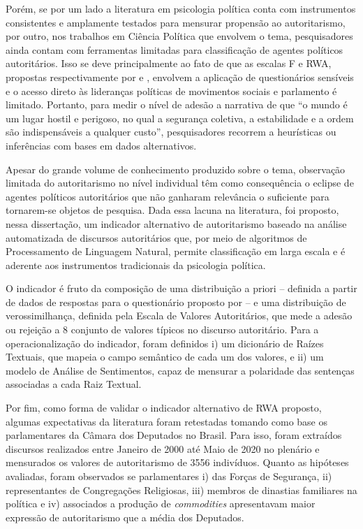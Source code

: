 \documentclass[
12pt,				%
openright,			%
twoside,			%
a4paper,			%
english,			%
french,				%
spanish,			%
brazil				%
]{abntex2}
\begin{document}
Porém, se por um lado a literatura em psicologia política conta com instrumentos consistentes e amplamente testados para mensurar propensão ao autoritarismo, por outro, nos trabalhos em Ciência Política que envolvem o tema, pesquisadores ainda contam com ferramentas limitadas para classificação de agentes políticos autoritários. Isso se deve principalmente ao fato de que as escalas F e RWA, propostas respectivamente por  e , envolvem a aplicação de questionários sensíveis e o acesso direto às lideranças políticas de movimentos sociais e parlamento é limitado. Portanto, para medir o nível de adesão a narrativa de que ``o mundo é um lugar hostil e perigoso, no qual a segurança coletiva, a estabilidade e a ordem são indispensáveis a qualquer custo'', pesquisadores recorrem a heurísticas ou inferências com bases em dados alternativos.

Apesar do grande volume de conhecimento produzido sobre o tema, observação limitada do autoritarismo no nível individual têm como consequência o eclipse de agentes políticos autoritários que não ganharam relevância o suficiente para tornarem-se objetos de pesquisa. Dada essa lacuna na literatura, foi proposto, nessa dissertação, um indicador alternativo de autoritarismo baseado na análise automatizada de discursos autoritários que, por meio de algoritmos de Processamento de Linguagem Natural, permite classificação em larga escala e é aderente aos instrumentos tradicionais da psicologia política. 

O indicador é fruto da composição de uma distribuição a priori -- definida a partir de dados de respostas para o questionário proposto por  -- e uma distribuição de verossimilhança, definida pela Escala de Valores Autoritários, que mede a adesão ou rejeição a 8 conjunto de valores típicos no discurso autoritário. Para a operacionalização do indicador, foram definidos i) um dicionário de Raízes Textuais, que mapeia o campo semântico de cada um dos valores, e ii) um modelo de Análise de Sentimentos, capaz de mensurar a polaridade das sentenças associadas a cada Raiz Textual.

Por fim, como forma de validar o indicador alternativo de RWA proposto, algumas expectativas da literatura foram retestadas tomando como base os parlamentares da Câmara dos Deputados no Brasil. Para isso, foram extraídos discursos realizados entre Janeiro de 2000 até Maio de 2020 no plenário e mensurados os valores de autoritarismo de 3556 indivíduos. Quanto as hipóteses avaliadas, foram observados se parlamentares i) das Forças de Segurança, ii) representantes de Congregações Religiosas, iii) membros de dinastias familiares na política e iv) associados a produção de \emph{commodities} apresentavam maior expressão de autoritarismo que a média dos Deputados.
\end{document}
